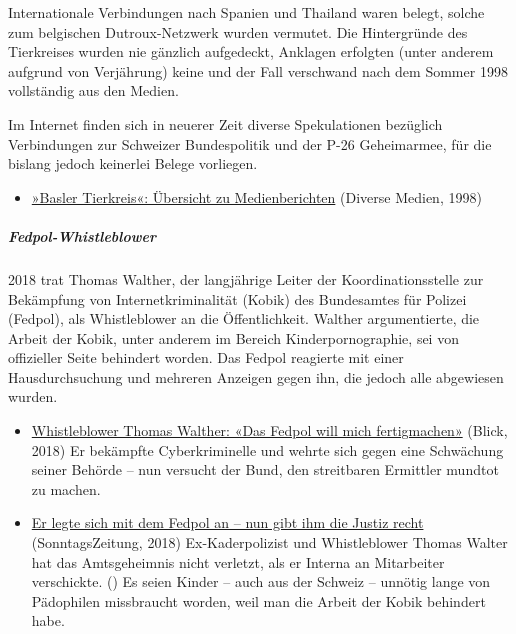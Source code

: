 Internationale Verbindungen nach Spanien und Thailand waren belegt,
solche zum belgischen Dutroux-Netzwerk wurden vermutet. Die Hintergründe
des Tierkreises wurden nie gänzlich aufgedeckt, Anklagen erfolgten
(unter anderem aufgrund von Verjährung) keine und der Fall verschwand
nach dem Sommer 1998 vollständig aus den Medien.

Im Internet finden sich in neuerer Zeit diverse Spekulationen bezüglich
Verbindungen zur Schweizer Bundespolitik und der P-26 Geheimarmee, für
die bislang jedoch keinerlei Belege vorliegen.

\begin{itemize}
\tightlist
\item
  \href{https://swprs.org/basler-tierkreis-medienberichte-1998/}{»Basler
  Tierkreis«: Übersicht zu Medienberichten} (Diverse Medien, 1998)
\end{itemize}

\hypertarget{fedpol-whistleblower}{%
\subparagraph{\texorpdfstring{\textbf{Fedpol-Whistleblower}}{Fedpol-Whistleblower}}\label{fedpol-whistleblower}}

2018 trat Thomas Walther, der langjährige Leiter der Koordinationsstelle
zur Bekämpfung von Internetkriminalität (Kobik) des Bundesamtes für
Polizei (Fedpol), als Whistleblower an die Öffentlichkeit. Walther
argumentierte, die Arbeit der Kobik, unter anderem im Bereich
Kinderpornographie, sei von offizieller Seite behindert worden. Das
Fedpol reagierte mit einer Hausdurchsuchung und mehreren Anzeigen gegen
ihn, die jedoch alle abgewiesen wurden.

\begin{itemize}
\tightlist
\item
  \href{https://www.blick.ch/news/schweiz/whistleblower-thomas-walther-fedpol-will-mich-fertigmachen-id8221584.html}{Whistleblower
  Thomas Walther: «Das Fedpol will mich fertigmachen»} (Blick, 2018) Er
  bekämpfte Cyberkriminelle und wehrte sich gegen eine Schwächung seiner
  Behörde -- nun versucht der Bund, den streitbaren Ermittler mundtot zu
  machen.
\item
  \href{https://www.tagesanzeiger.ch/sonntagszeitung/bundesanwaltschaft-schuetzt-whistleblower/story/30372831}{Er
  legte sich mit dem Fedpol an -- nun gibt ihm die Justiz recht}
  (SonntagsZeitung, 2018) Ex-Kaderpolizist und Whistleblower Thomas
  Walter hat das Amtsgeheimnis nicht verletzt, als er Interna an
  Mitarbeiter verschickte. () Es seien Kinder -- auch aus der Schweiz --
  unnötig lange von Pädophilen missbraucht worden, weil man die Arbeit
  der Kobik behindert habe.
\end{itemize}

